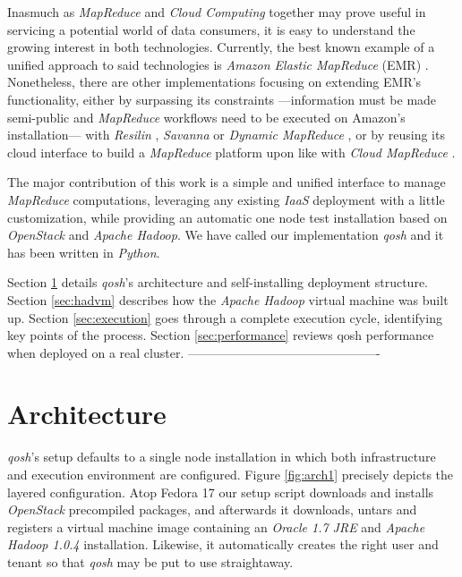 \documentclass{sig-alternate}
\begin{document}
Inasmuch as \emph{MapReduce} and \emph{Cloud Computing} together may prove useful in servicing a potential world of data consumers, it is easy to understand the growing interest in both technologies. Currently, the best known example of a unified approach to said technologies is \emph{Amazon Elastic MapReduce} (EMR) \cite{emr:2013:online}. Nonetheless, there are other implementations focusing on extending EMR's functionality, either by surpassing its constraints ---information must be made semi-public and \emph{MapReduce} workflows need to be executed on Amazon's installation--- with \emph{Resilin} \cite{resilin}, \emph{Savanna} \cite{savanna:2013:online} or \emph{Dynamic MapReduce} \cite{dynamicmapreduce}, or by reusing its cloud interface to build a \emph{MapReduce} platform upon like with \emph{Cloud MapReduce} \cite{cloudmapreduce}.

The major contribution of this work is a simple and unified interface to manage \emph{MapReduce} computations, leveraging any existing \emph{IaaS} deployment with a little customization, while providing an automatic one node test installation based on \emph{OpenStack} and \emph{Apache Hadoop}. We have called our implementation \emph{qosh} and it has been written in \emph{Python}.

Section \ref{sec:arch} details \emph{qosh}'s architecture and self-installing deployment structure. Section \ref{sec:hadvm} describes how the \emph{Apache Hadoop} virtual machine was built up. Section \ref{sec:execution} goes through a complete execution cycle, identifying key points of the process. Section \ref{sec:performance} reviews qosh performance when deployed on a real cluster. ----------------------------------------------



\section{Architecture}\label{sec:arch}
\noindent \emph{qosh}'s setup defaults to a single node installation in which both infrastructure and execution environment are configured. Figure \ref{fig:arch1} precisely depicts the layered configuration. Atop Fedora 17 our setup script downloads and installs \emph{OpenStack} precompiled packages, and afterwards it downloads, untars and registers a virtual machine image containing an \emph{Oracle 1.7 JRE} and \emph{Apache Hadoop 1.0.4} installation. Likewise, it automatically creates the right user and tenant so that \emph{qosh} may be put to use straightaway.
\end{document}
